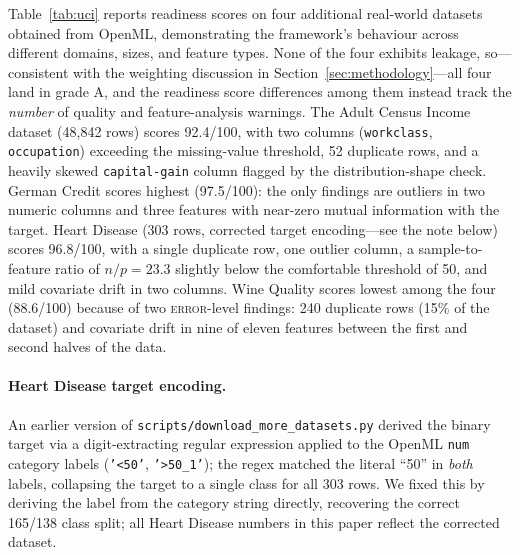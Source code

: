 \documentclass[11pt]{article}
\begin{document}
Table~\ref{tab:uci} reports readiness scores on four additional real-world
datasets obtained from OpenML, demonstrating the framework's behaviour
across different domains, sizes, and feature types.  None of the four
exhibits leakage, so---consistent with the weighting discussion in
Section~\ref{sec:methodology}---all four land in grade A, and the readiness
score differences among them instead track the \emph{number} of quality and
feature-analysis warnings.  The Adult Census Income dataset (48,842 rows)
scores 92.4/100, with two columns (\texttt{workclass}, \texttt{occupation})
exceeding the missing-value threshold, 52 duplicate rows, and a heavily
skewed \texttt{capital-gain} column flagged by the distribution-shape check.
German Credit scores highest (97.5/100): the only findings are outliers in
two numeric columns and three features with near-zero mutual information
with the target.  Heart Disease (303 rows, corrected target encoding---see
the note below) scores 96.8/100, with a single duplicate row, one outlier
column, a sample-to-feature ratio of $n/p{=}23.3$ slightly below the
comfortable threshold of 50, and mild covariate drift in two columns.  Wine
Quality scores lowest among the four (88.6/100) because of two
\textsc{error}-level findings: 240 duplicate rows (15\% of the dataset) and
covariate drift in nine of eleven features between the first and second
halves of the data.

\paragraph{Heart Disease target encoding.}
An earlier version of \texttt{scripts/download\_more\_datasets.py} derived
the binary target via a digit-extracting regular expression applied to the
OpenML \texttt{num} category labels (\texttt{'<50'}, \texttt{'>50\_1'}); the
regex matched the literal ``50'' in \emph{both} labels, collapsing the
target to a single class for all 303 rows. We fixed this by deriving the
label from the category string directly, recovering the correct 165/138
class split; all Heart Disease numbers in this paper reflect the corrected
dataset.
\end{document}
